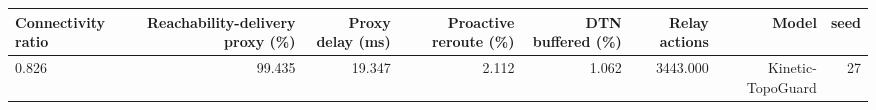 \begin{tabular}{lrrrrrrr}
\toprule
Connectivity ratio & Reachability-delivery proxy (\%) & Proxy delay (ms) & Proactive reroute (\%) & DTN buffered (\%) & Relay actions & Model & seed \\
\midrule
0.826 & 99.435 & 19.347 & 2.112 & 1.062 & 3443.000 & Kinetic-TopoGuard & 27 \\
\bottomrule
\end{tabular}